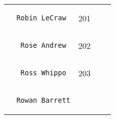 \documentclass[]{article}
\begin{document}
\begin{longtable}[c]{@{}llll@{}}
\begin{minipage}[t]{0.39\columnwidth}\raggedright
\begin{verbatim}
  Robin LeCraw
\end{verbatim}
\end{minipage} & \begin{minipage}[t]{0.10\columnwidth}\raggedright
201
\end{minipage} & \begin{minipage}[t]{0.13\columnwidth}\raggedright
\end{minipage} & \begin{minipage}[t]{0.15\columnwidth}\raggedright
\end{minipage}
\\\noalign{\medskip}
\begin{minipage}[t]{0.39\columnwidth}\raggedright
\begin{verbatim}
   Rose Andrew
\end{verbatim}
\end{minipage} & \begin{minipage}[t]{0.10\columnwidth}\raggedright
202
\end{minipage} & \begin{minipage}[t]{0.13\columnwidth}\raggedright
\end{minipage} & \begin{minipage}[t]{0.15\columnwidth}\raggedright
\end{minipage}
\\\noalign{\medskip}
\begin{minipage}[t]{0.39\columnwidth}\raggedright
\begin{verbatim}
   Ross Whippo
\end{verbatim}
\end{minipage} & \begin{minipage}[t]{0.10\columnwidth}\raggedright
203
\end{minipage} & \begin{minipage}[t]{0.13\columnwidth}\raggedright
\end{minipage} & \begin{minipage}[t]{0.15\columnwidth}\raggedright
\end{minipage}
\\\noalign{\medskip}
\begin{minipage}[t]{0.39\columnwidth}\raggedright
\begin{verbatim}
  Rowan Barrett
\end{verbatim}
\end{minipage} & \begin{minipage}[t]{0.10\columnwidth}\raggedright

\end{minipage}
\end{longtable}
\end{document}

